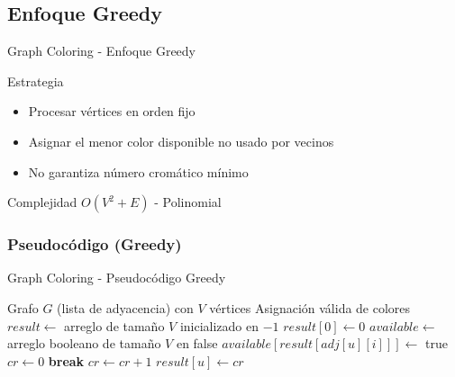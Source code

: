 \documentclass[aspectratio=169]{beamer}
\renewcommand{\algorithmicrequire}{\textbf{Entrada:}}
\renewcommand{\algorithmicensure}{\textbf{Salida:}}
\newcommand{\REQUIRE}{\State[\algorithmicrequire]}
\newcommand{\ENSURE}{\State[\algorithmicensure]}
\begin{document}
\subsection{Enfoque Greedy}
\begin{frame}{Graph Coloring - Enfoque Greedy}
\begin{block}{Estrategia}
\begin{itemize}
\item Procesar vértices en orden fijo
\item Asignar el menor color disponible no usado por vecinos
\item No garantiza número cromático mínimo
\end{itemize}
\end{block}

\begin{alertblock}{Complejidad}
$O(V^2 + E)$ - Polinomial
\end{alertblock}
\end{frame}

\subsubsection{Pseudocódigo (Greedy)}
\begin{frame}[fragile]{Graph Coloring - Pseudocódigo Greedy}
\scriptsize
\begin{algorithmic}[1]
\REQUIRE Grafo $G$ (lista de adyacencia) con $V$ vértices
\ENSURE Asignación válida de colores
\State $result \leftarrow$ arreglo de tamaño $V$ inicializado en $-1$ 
\State $result[0] \leftarrow 0$ 
\State $available \leftarrow$ arreglo booleano de tamaño $V$ en false 
            \State $available[result[adj[u][i]]] \leftarrow$ true
        \EndIf
    \EndFor
    \State $cr \leftarrow 0$
            \State \textbf{break}
        \EndIf
        \State $cr \leftarrow cr + 1$
    \EndWhile
    \State $result[u] \leftarrow cr$ 
\end{algorithmic}
\normalsize
\end{frame}
\end{document}
